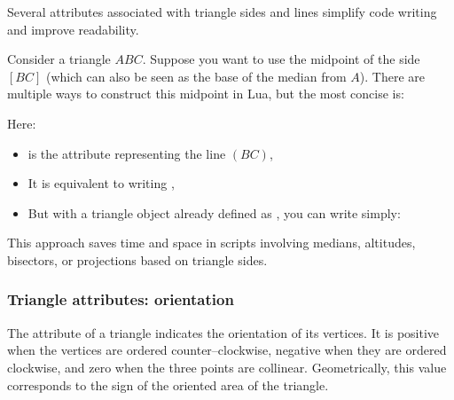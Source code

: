 Several attributes associated with triangle sides and lines simplify code writing and improve readability.

\medskip

Consider a triangle $ABC$. Suppose you want to use the midpoint of the side $[BC]$ (which can also be seen as the base of the median from $A$). There are multiple ways to construct this midpoint in Lua, but the most concise is:

\begin{center}
\end{center}


Here:
\begin{itemize}
  \item {} is the attribute representing the line $(BC)$,
  \item It is equivalent to writing ,
  \item But with a triangle object already defined as , you can write simply:
  \begin{center}
  \end{center}
\end{itemize}

\medskip

This approach saves time and space in scripts involving medians, altitudes, bisectors, or projections based on triangle sides.

\vspace{1em}

\begin{tkzexample}[latex=.5\textwidth]
\end{tkzexample}

\subsubsection{Triangle attributes: orientation}
\label{ssub:triangle_attributes_orientation}
The  attribute of a triangle indicates the orientation
of its vertices.
It is positive when the vertices are ordered counter--clockwise,
negative when they are ordered clockwise,
and zero when the three points are collinear.
Geometrically, this value corresponds to the sign of the oriented area
of the triangle.

